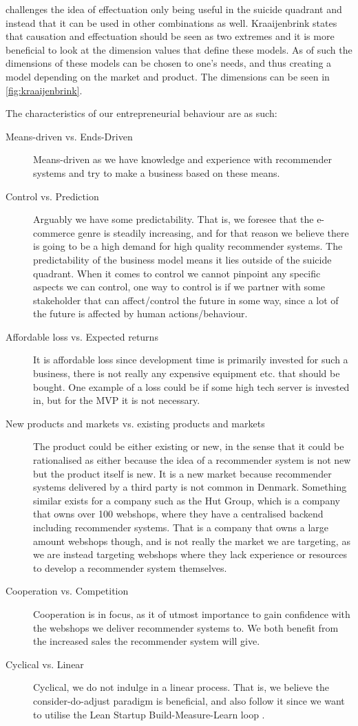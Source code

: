 \citet{doi:10.1108/S1876-0228(2012)0000009015} challenges the idea of effectuation only being useful in the suicide quadrant and instead that it can be used in other combinations as well.
Kraaijenbrink states that causation and effectuation should be seen as two extremes and it is more beneficial to look at the dimension values that define these models.
As of such the dimensions of these models can be chosen to one's needs, and thus creating a model depending on the market and product.
The dimensions can be seen in \cref{fig:kraaijenbrink}.

The characteristics of our entrepreneurial behaviour are as such:
\begin{description}
	\item[Means-driven vs. Ends-Driven] Means-driven as we have knowledge and experience with recommender systems and try to make a business based on these means.
	\item[Control vs. Prediction] Arguably we have some predictability. That is, we foresee that the e-commerce genre is steadily increasing, and for that reason we believe there is going to be a high demand for high quality recommender systems. The predictability of the business model means it lies outside of the suicide quadrant.
	When it comes to control we cannot pinpoint any specific aspects we can control, one way to control is if we partner with some stakeholder that can affect/control the future in some way, since a lot of the future is affected by human actions/behaviour.
	\item[Affordable loss vs. Expected returns] It is affordable loss since development time is primarily invested for such a business, there is not really any expensive equipment etc. that should be bought. One example of a loss could be if some high tech server is invested in, but for the MVP it is not necessary.
	\item[New products and markets vs. existing products and markets] The product could be either existing or new, in the sense that it could be rationalised as either because the idea of a recommender system is not new but the product itself is new. 
	It is a new market because recommender systems delivered by a third party is not common in Denmark. Something similar exists for a company such as the Hut Group, which is a company that owns over 100 webshops, where they have a centralised backend including recommender systems. That is a company that owns a large amount webshops though, and is not really the market we are targeting, as we are instead targeting webshops where they lack experience or resources to develop a recommender system themselves.
	\item[Cooperation vs. Competition] Cooperation is in focus, as it of utmost importance to gain confidence with the webshops we deliver recommender systems to. We both benefit from the increased sales the recommender system will give.
	\item[Cyclical vs. Linear] Cyclical, we do not indulge in a linear process. That is, we believe the consider-do-adjust paradigm is beneficial, and also follow it since we want to utilise the Lean Startup Build-Measure-Learn loop \citep[pg. 75]{ries2011lean}.
\end{description}


